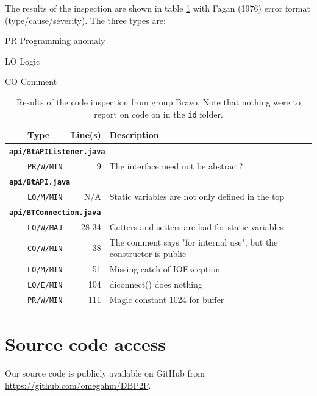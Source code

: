 \documentclass[a4paper,11pt]{article}
\begin{document}
The results of the inspection are shown in table \ref{inspection-results} with Fagan (1976) error format (type/cause/severity). The three types are:

\begin{description}
\item{PR} Programming anomaly
\item{LO} Logic
\item{CO} Comment
\end{description}

\begin{table}
\begin{tabular}{llrl}
\toprule
\ \  & {\bf Type} & {\bf Line(s)} & {\bf Description} \\
\midrule
\multicolumn{4}{l}{{\bf {\tt api/BtAPIListener.java}}} \\
& {\tt PR/W/MIN} & 9 & The interface need not be abstract? \\
\midrule
\multicolumn{4}{l}{{\bf {\tt api/BtAPI.java}}} \\
& {\tt LO/M/MIN} & N/A & Static variables are not only defined in the top \\
\midrule
\multicolumn{4}{l}{{\bf {\tt api/BTConnection.java}}} \\
& {\tt LO/W/MAJ} & 28-34 & Getters and setters are bad for static variables \\
& {\tt CO/W/MIN} & 38 & The comment says "for internal use", but the constructor is public \\
& {\tt LO/M/MIN} & 51 & Missing catch of IOException \\
& {\tt LO/E/MIN} & 104 & diconnect() does nothing \\
& {\tt PR/W/MIN} & 111 & Magic constant 1024 for buffer \\
\bottomrule
\end{tabular}
\caption{Results of the code inspection from group Bravo. Note that nothing were to report on code on in the {\tt id} folder.}
\label{inspection-results}
\end{table}



\section{Source code access}
Our source code is publicly available on GitHub from \url{https://github.com/omegahm/DBP2P}.
\end{document}
